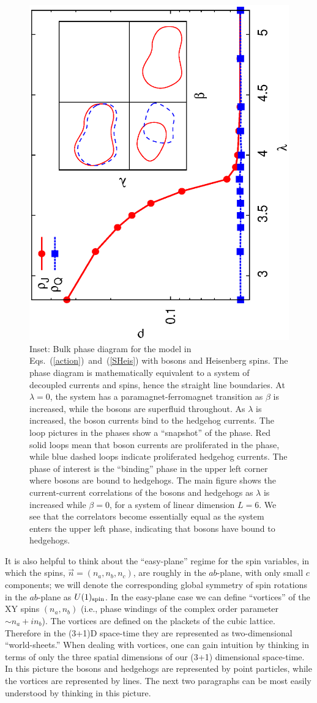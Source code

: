 \begin{figure}
\includegraphics[angle=-90,width=0.6\linewidth]{figures/heisbulkout.eps}
\caption{Inset: Bulk phase diagram for the model in Eqs.~(\ref{action})~and~(\ref{SHeis}) with bosons and Heisenberg spins. The phase diagram is mathematically equivalent to a system of decoupled currents and spins, hence the straight line boundaries. At $\lambda=0$, the system has a paramagnet-ferromagnet transition as $\beta$ is increased, while the bosons are superfluid throughout. As $\lambda$ is increased, the boson currents bind to the hedgehog currents. The loop pictures in the phases show a ``snapshot'' of the phase. Red solid loops mean that boson currents are proliferated in the phase, while blue dashed loops indicate proliferated hedgehog currents. The phase of interest is the ``binding'' phase in the upper left corner where bosons are bound to hedgehogs. The main figure shows the current-current correlations of the bosons and hedgehogs as $\lambda$ is increased while $\beta=0$, for a system of linear dimension $L=6$. We see that the correlators become essentially equal as the system enters the upper left phase, indicating that bosons have bound to hedgehogs.}
\label{heisbulk}
\end{figure}


It is also helpful to think about the ``easy-plane'' regime for the spin variables, in which the spins, $\vec{n} = (n_a, n_b, n_c)$, are roughly in the $ab$-plane, with only small $c$ components; we will denote the corresponding global symmetry of spin rotations in the $ab$-plane as $U(1)_{\rm spin}$. In the easy-plane case we can define ``vortices'' of the XY spins $(n_a, n_b)$ (i.e., phase windings of the complex order parameter $\sim n_a + i n_b$). %
The vortices are defined on the plackets of the cubic lattice. Therefore in the (3+1)D space-time they are represented as two-dimensional ``world-sheets.'' When dealing with vortices, one can gain intuition by thinking in terms of only the three spatial dimensions of our (3+1) dimensional space-time. In this picture the bosons and hedgehogs are represented by point particles, while the vortices are represented by lines. The next two paragraphs can be most easily understood by thinking in this picture.

